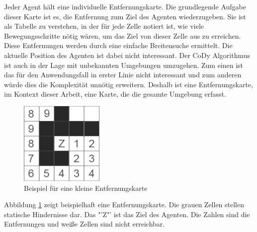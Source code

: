 Jeder Agent hält eine individuelle Entfernungskarte. Die grundlegende Aufgabe dieser Karte ist es, die Entfernung zum Ziel des Agenten wiederzugeben. Sie ist als Tabelle zu verstehen, in der für jede Zelle notiert ist, wie viele Bewegungsschritte nötig wären, um das Ziel von dieser Zelle aus zu erreichen. Diese Entfernungen werden durch eine einfache Breitensuche ermittelt. Die aktuelle Position des Agenten ist dabei nicht interessant. Der CoDy Algorithmus ist auch in der Lage mit unbekannten Umgebungen umzugehen. \cite{book:regele} \newline Zum einen ist das für den Anwendungsfall in erster Linie nicht interessant und zum anderen würde dies die Komplexität unnötig erweitern. Deshalb ist eine Entfernungskarte, im Kontext dieser Arbeit, eine Karte, die die gesamte Umgebung erfasst.
\begin{figure}[H]
    \includegraphics[height=40mm]{images/example_distancemap.png}
    \centering
    \caption{Beispiel für eine kleine Entfernungskarte}
    \label{fig:example_distancemap}
\end{figure}
Abbildung \ref{fig:example_distancemap} zeigt beispielhaft eine Entfernungskarte. Die grauen Zellen stellen statische Hindernisse dar. Das "'Z"' ist das Ziel des Agenten. Die Zahlen sind die Entfernungen und weiße Zellen sind nicht erreichbar.